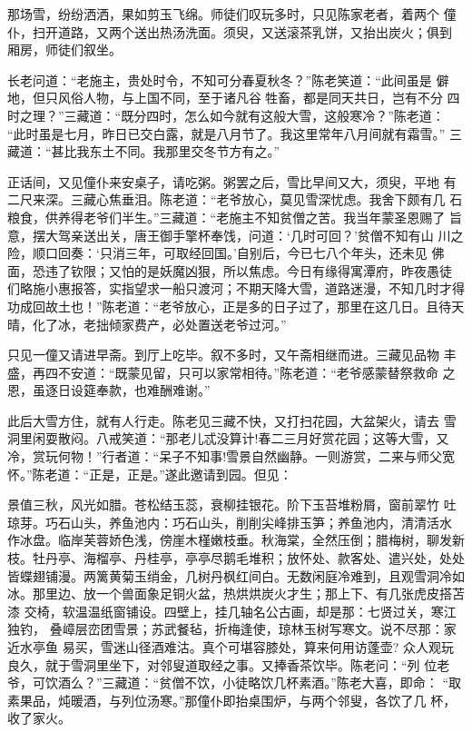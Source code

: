 那场雪，纷纷洒洒，果如剪玉飞绵。师徒们叹玩多时，只见陈家老者，着两个
僮仆，扫开道路，又两个送出热汤洗面。须臾，又送滚茶乳饼，又抬出炭火；俱到
厢房，师徒们叙坐。

长老问道：“老施主，贵处时令，不知可分春夏秋冬？”陈老笑道：“此间虽是
僻地，但只风俗人物，与上国不同，至于诸凡谷牲畜，都是同天共日，岂有不分
四时之理？”三藏道：“既分四时，怎么如今就有这般大雪，这般寒冷？”陈老道：
“此时虽是七月，昨日已交白露，就是八月节了。我这里常年八月间就有霜雪。”
三藏道：“甚比我东土不同。我那里交冬节方有之。”

正话间，又见僮仆来安桌子，请吃粥。粥罢之后，雪比早间又大，须臾，平地
有二尺来深。三藏心焦垂泪。陈老道：“老爷放心，莫见雪深忧虑。我舍下颇有几
石粮食，供养得老爷们半生。”三藏道：“老施主不知贫僧之苦。我当年蒙圣恩赐了
旨意，摆大驾亲送出关，唐王御手擎杯奉饯，问道：‘几时可回？’贫僧不知有山
川之险，顺口回奏：‘只消三年，可取经回国。’自别后，今已七八个年头，还未见
佛面，恐违了钦限；又怕的是妖魔凶狠，所以焦虑。今日有缘得寓潭府，昨夜愚徒
们略施小惠报答，实指望求一船只渡河；不期天降大雪，道路迷漫，不知几时才得
功成回故土也！”陈老道：“老爷放心，正是多的日子过了，那里在这几日。且待天
晴，化了冰，老拙倾家费产，必处置送老爷过河。”

只见一僮又请进早斋。到厅上吃毕。叙不多时，又午斋相继而进。三藏见品物
丰盛，再四不安道：“既蒙见留，只可以家常相待。”陈老道：“老爷感蒙替祭救命
之恩，虽逐日设筵奉款，也难酬难谢。”

此后大雪方住，就有人行走。陈老见三藏不快，又打扫花园，大盆架火，请去
雪洞里闲耍散闷。八戒笑道：“那老儿忒没算计!春二三月好赏花园；这等大雪，又
冷，赏玩何物！”行者道：“呆子不知事!雪景自然幽静。一则游赏，二来与师父宽
怀。”陈老道：“正是，正是。”遂此邀请到园。但见：

景值三秋，风光如腊。苍松结玉蕊，衰柳挂银花。阶下玉苔堆粉屑，窗前翠竹
吐琼芽。巧石山头，养鱼池内：巧石山头，削削尖峰排玉笋；养鱼池内，清清活水
作冰盘。临岸芙蓉娇色浅，傍崖木槿嫩枝垂。秋海棠，全然压倒；腊梅树，聊发新
枝。牡丹亭、海榴亭、丹桂亭，亭亭尽鹅毛堆积；放怀处、款客处、遣兴处，处处
皆蝶翅铺漫。两篱黄菊玉绡金，几树丹枫红间白。无数闲庭冷难到，且观雪洞冷如
冰。那里边、放一个兽面象足铜火盆，热烘烘炭火才生；那上下、有几张虎皮搭苫
漆
交椅，软温温纸窗铺设。四壁上，挂几轴名公古画，却是那：七贤过关，寒江独钓，
叠嶂层峦团雪景；苏武餐毡，折梅逢使，琼林玉树写寒文。说不尽那：家近水亭鱼
易买，雪迷山径酒难沽。真个可堪容膝处，算来何用访蓬壶?
众人观玩良久，就于雪洞里坐下，对邻叟道取经之事。又捧香茶饮毕。陈老问：“列
位老爷，可饮酒么？”三藏道：“贫僧不饮，小徒略饮几杯素酒。”陈老大喜，即命：
“取素果品，炖暖酒，与列位汤寒。”那僮仆即抬桌围炉，与两个邻叟，各饮了几
杯，收了家火。

